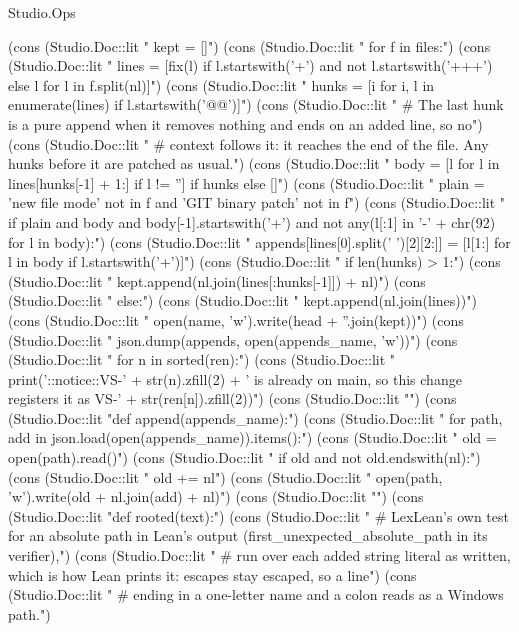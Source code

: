 \begin{lexlean}{Studio.Ops}
\begin{semanticmodule}
{    (cons (Studio.Doc::lit "    kept = []\n")
    (cons (Studio.Doc::lit "    for f in files:\n")
    (cons (Studio.Doc::lit "        lines = [fix(l) if l.startswith('+') and not l.startswith('+++') else l for l in f.split(nl)]\n")
    (cons (Studio.Doc::lit "        hunks = [i for i, l in enumerate(lines) if l.startswith('@@')]\n")
    (cons (Studio.Doc::lit "        # The last hunk is a pure append when it removes nothing and ends on an added line, so no\n")
    (cons (Studio.Doc::lit "        # context follows it: it reaches the end of the file. Any hunks before it are patched as usual.\n")
    (cons (Studio.Doc::lit "        body = [l for l in lines[hunks[-1] + 1:] if l != ''] if hunks else []\n")
    (cons (Studio.Doc::lit "        plain = 'new file mode' not in f and 'GIT binary patch' not in f\n")
    (cons (Studio.Doc::lit "        if plain and body and body[-1].startswith('+') and not any(l[:1] in '-' + chr(92) for l in body):\n")
    (cons (Studio.Doc::lit "            appends[lines[0].split(' ')[2][2:]] = [l[1:] for l in body if l.startswith('+')]\n")
    (cons (Studio.Doc::lit "            if len(hunks) > 1:\n")
    (cons (Studio.Doc::lit "                kept.append(nl.join(lines[:hunks[-1]]) + nl)\n")
    (cons (Studio.Doc::lit "        else:\n")
    (cons (Studio.Doc::lit "            kept.append(nl.join(lines))\n")
    (cons (Studio.Doc::lit "    open(name, 'w').write(head + ''.join(kept))\n")
    (cons (Studio.Doc::lit "    json.dump(appends, open(appends_name, 'w'))\n")
    (cons (Studio.Doc::lit "    for n in sorted(ren):\n")
    (cons (Studio.Doc::lit "        print('::notice::VS-' + str(n).zfill(2) + ' is already on main, so this change registers it as VS-' + str(ren[n]).zfill(2))\n")
    (cons (Studio.Doc::lit "\n")
    (cons (Studio.Doc::lit "def append(appends_name):\n")
    (cons (Studio.Doc::lit "    for path, add in json.load(open(appends_name)).items():\n")
    (cons (Studio.Doc::lit "        old = open(path).read()\n")
    (cons (Studio.Doc::lit "        if old and not old.endswith(nl):\n")
    (cons (Studio.Doc::lit "            old += nl\n")
    (cons (Studio.Doc::lit "        open(path, 'w').write(old + nl.join(add) + nl)\n")
    (cons (Studio.Doc::lit "\n")
    (cons (Studio.Doc::lit "def rooted(text):\n")
    (cons (Studio.Doc::lit "    # LexLean's own test for an absolute path in Lean's output (first_unexpected_absolute_path in its verifier),\n")
    (cons (Studio.Doc::lit "    # run over each added string literal as written, which is how Lean prints it: escapes stay escaped, so a line\n")
    (cons (Studio.Doc::lit "    # ending in a one-letter name and a colon reads as a Windows path.\n")
}
\end{semanticmodule}
\end{lexlean}
